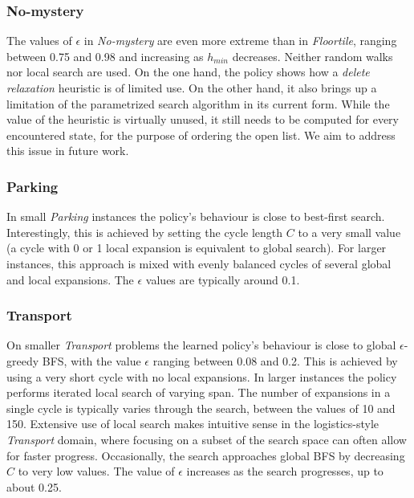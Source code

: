 \documentclass[letterpaper]{article} %
\begin{document}
\subsubsection{No-mystery} The values of $\epsilon$ in \emph{No-mystery} are even more extreme than in \emph{Floortile}, ranging between 0.75 and 0.98 and increasing as $h_{min}$ decreases. Neither random walks nor local search are used. On the one hand, the policy shows how a \emph{delete relaxation} heuristic is of limited use. On the other hand, it also brings up a limitation of the parametrized search algorithm in its current form. While the value of the heuristic is virtually unused, it still needs to be computed for every encountered state, for the purpose of ordering the open list. We aim to address this issue in future work. %

\subsubsection{Parking} In small \emph{Parking} instances the policy's behaviour is close to best-first search. Interestingly, this is achieved by setting the cycle length $C$ to a very small value (a cycle with 0 or 1 local expansion is equivalent to global search). For larger instances, this approach is mixed with evenly balanced cycles of several global and local expansions. The $\epsilon$ values are typically around 0.1. 

\subsubsection{Transport} On smaller \emph{Transport} problems the learned policy's behaviour is close to global $\epsilon$-greedy BFS, with the value $\epsilon$ ranging between 0.08 and 0.2. This is achieved by using a very short cycle with no local expansions. In larger instances the policy performs iterated local search of varying span. The number of expansions in a single cycle is typically varies through the search, between the values of 10 and 150. Extensive use of local search makes intuitive sense in the logistics-style \emph{Transport} domain, where focusing on a subset of the search space can often allow for faster progress. Occasionally, the search approaches global BFS by decreasing $C$ to very low values. The value of $\epsilon$ increases as the search progresses, up to about 0.25.
\end{document}
